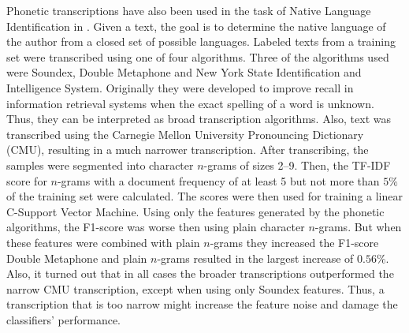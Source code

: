 Phonetic transcriptions have also been used in the task of Native Language Identification in \cite{smiley2017native}.
Given a text, the goal is to determine the native language of the author from a closed set of possible languages.
Labeled texts from a training set were transcribed using one of four algorithms.
Three of the algorithms used were Soundex, Double Metaphone and New York State Identification and Intelligence System.
Originally they were developed to improve recall in information retrieval systems when the exact spelling of a word is unknown.
Thus, they can be interpreted as broad transcription algorithms.
Also, text was transcribed using the Carnegie Mellon University Pronouncing Dictionary (CMU), resulting in a much narrower transcription.
After transcribing, the samples were segmented into character $n$-grams of sizes 2--9.
Then, the TF-IDF score for $n$-grams with a document frequency of at least 5 but not more than $5\%$ of the training set were calculated.
The scores were then used for training a linear C-Support Vector Machine.
Using only the features generated by the phonetic algorithms, the F1-score was worse then using plain character $n$-grams.
But when these features were combined with plain $n$-grams they increased the F1-score
Double Metaphone and plain $n$-grams resulted in the largest increase of $0.56\%$.
Also, it turned out that in all cases the broader transcriptions outperformed the narrow CMU transcription, except when using only Soundex features.
Thus, a transcription that is too narrow might increase the feature noise and damage the classifiers' performance.